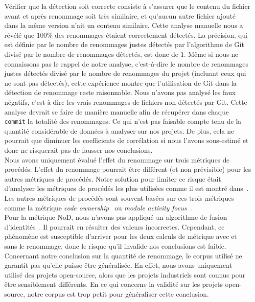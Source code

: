 Vérifier que la détection soit correcte consiste à s'assurer que le contenu du fichier avant et après renommage soit très similaire, et qu'aucun autre fichier ajouté dans la même version n'ait un contenu similaire. Cette analyse manuelle nous a révélé que  $100\%$ des renommages étaient correctement détectés. La précision, qui est définie par le nombre de renommages justes détectés par l'algorithme de Git divisé par le nombre de renommages détectés, est donc de $1$. Même si nous ne connaissons pas le rappel de notre analyse, c'est-à-dire le nombre de renommages justes détectés divisé par le nombre de renommages du projet (incluant ceux qui ne sont pas détectés), cette expérience montre que l'utilisation de Git dans la détection de renommage reste raisonnable. Nous n'avons pas analysé les faux négatifs, c'est à dire les vrais renommages de fichiers non détectés par Git. Cette analyse devrait se faire de manière manuelle afin de récupérer dans chaque \texttt{commit} la totalité des renommages. Ce qui n'est pas faisable compte tenu de la quantité considérable de données à analyser sur nos projets. De plus, cela ne pourrait que diminuer les coefficients de corrélation si nous l'avons sous-estimé et donc ne risquerait pas de fausser nos conclusions.\\  

Nous avons uniquement évalué l'effet du renommage sur trois métriques de procédés. L'effet du renommage pourrait être différent (et non prévisible) pour les autres métriques de procédés. Notre solution pour limiter ce risque était d'analyser les métriques de procédés les plus utilisées comme il est montré dans~\cite{radjenovic_software_2013}. Les autres métriques de procédés sont souvent basées sur ces trois métriques comme la métrique \emph{code ownership}~\cite{bird_dont_2011} ou \emph{module activity focus}~\cite{posnett_dual_2013}.\\

Pour la métrique NoD, nous n'avons pas appliqué un algorithme de fusion d'identités~\cite{goeminne_comparison_2013}. Il pourrait en résulter des valeurs incorrectes. Cependant, ce phénomène est susceptible d'arriver pour les deux calculs de métrique avec et sans le renommage, donc le risque qu'il invalide nos conclusions est faible.\\

Concernant notre conclusion sur la quantité de renommage, le corpus utilisé ne garantit pas qu'elle puisse être généralisée. En effet, nous avons uniquement utilisé des projets open-source, alors que les projets industriels sont connus pour être sensiblement différents. En ce qui concerne la validité sur les projets open-source, notre corpus est trop petit pour généraliser cette conclusion.\\
